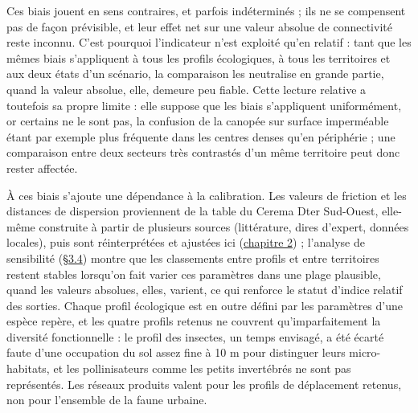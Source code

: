 \documentclass[a4paper,11pt]{report}
\begin{document}
Ces biais jouent en sens contraires, et parfois indéterminés ; ils ne se compensent pas de façon prévisible, et leur effet net sur une valeur absolue de connectivité reste inconnu. C'est pourquoi l'indicateur n'est exploité qu'en relatif : tant que les mêmes biais s'appliquent à tous les profils écologiques, à tous les territoires et aux deux états d'un scénario, la comparaison les neutralise en grande partie, quand la valeur absolue, elle, demeure peu fiable. Cette lecture relative a toutefois sa propre limite : elle suppose que les biais s'appliquent uniformément, or certains ne le sont pas, la confusion de la canopée sur surface imperméable étant par exemple plus fréquente dans les centres denses qu'en périphérie ; une comparaison entre deux secteurs très contrastés d'un même territoire peut donc rester affectée.

À ces biais s'ajoute une dépendance à la calibration. Les valeurs de friction et les distances de dispersion proviennent de la table du Cerema Dter Sud-Ouest, elle-même construite à partir de plusieurs sources (littérature, dires d'expert, données locales), puis sont réinterprétées et ajustées ici (\hyperref[chap:2]{chapitre 2}) ; l'analyse de sensibilité (\hyperref[sec:3.4]{§3.4}) montre que les classements entre profils et entre territoires restent stables lorsqu'on fait varier ces paramètres dans une plage plausible, quand les valeurs absolues, elles, varient, ce qui renforce le statut d'indice relatif des sorties. Chaque profil écologique est en outre défini par les paramètres d'une espèce repère, et les quatre profils retenus ne couvrent qu'imparfaitement la diversité fonctionnelle : le profil des insectes, un temps envisagé, a été écarté faute d'une occupation du sol assez fine à 10 m pour distinguer leurs micro-habitats, et les pollinisateurs comme les petits invertébrés ne sont pas représentés. Les réseaux produits valent pour les profils de déplacement retenus, non pour l'ensemble de la faune urbaine.
\end{document}
